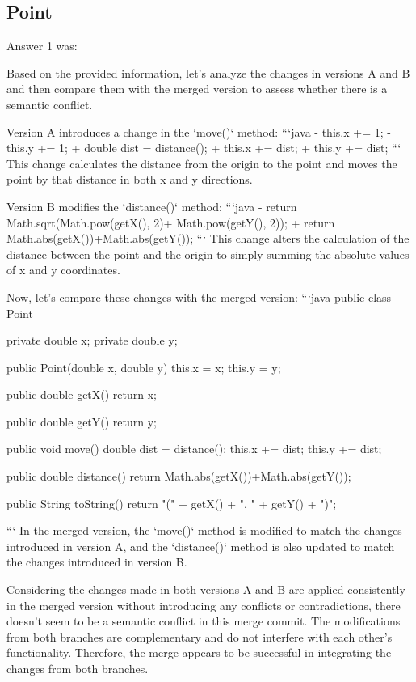 \subsection{Point}

Answer 1 was:
\begin{spverbatim}
Based on the provided information, let's analyze the changes in versions A and B and then compare them with the merged version to assess whether there is a semantic conflict.

Version A introduces a change in the `move()` method:
```java
-         this.x += 1;
-         this.y += 1;
+         double dist = distance();
+         this.x += dist;
+         this.y += dist;
```
This change calculates the distance from the origin to the point and moves the point by that distance in both x and y directions.

Version B modifies the `distance()` method:
```java
-        return Math.sqrt(Math.pow(getX(), 2)+ Math.pow(getY(), 2));
+        return Math.abs(getX())+Math.abs(getY());
```
This change alters the calculation of the distance between the point and the origin to simply summing the absolute values of x and y coordinates.

Now, let's compare these changes with the merged version:
```java
public class Point {
    private double x;
    private double y;

    public Point(double x, double y) {
        this.x = x;
        this.y = y;
    }

    public double getX() {
        return x;
    }

    public double getY() {
        return y;
    }

     public void move() {
         double dist = distance();
         this.x += dist;
         this.y += dist;
     }

    public double distance() {
        return Math.abs(getX())+Math.abs(getY());
    }

    public String toString() {
        return "(" + getX() + ", " + getY() + ")";
    }
}
```
In the merged version, the `move()` method is modified to match the changes introduced in version A, and the `distance()` method is also updated to match the changes introduced in version B.

Considering the changes made in both versions A and B are applied consistently in the merged version without introducing any conflicts or contradictions, there doesn't seem to be a semantic conflict in this merge commit. The modifications from both branches are complementary and do not interfere with each other's functionality. Therefore, the merge appears to be successful in integrating the changes from both branches.
\end{spverbatim}

